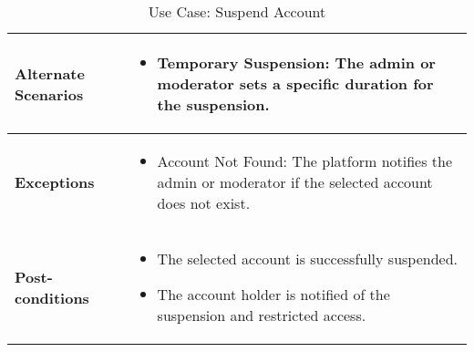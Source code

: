 \begin{table}[!ht]
\begin{tabularx}{\textwidth}{|l|X|}
        \textbf{Alternate Scenarios} & 
        \begin{itemize}[label=--,itemsep=0pt]
            \item Temporary Suspension: The admin or moderator sets a specific duration for the suspension.
        \end{itemize} \\
        \hline
        \textbf{Exceptions} & 
        \begin{itemize}[label=--,itemsep=0pt]
            \item Account Not Found: The platform notifies the admin or moderator if the selected account does not exist.
        \end{itemize} \\
        \hline
        \textbf{Post-conditions} & 
        \begin{itemize}[label=--,itemsep=0pt]
            \item The selected account is successfully suspended.
            \item The account holder is notified of the suspension and restricted access.
        \end{itemize} \\
        \hline
    \end{tabularx}
    \caption{Use Case: Suspend Account}
    \label{tab:use-case-suspend-account}
\end{table}

